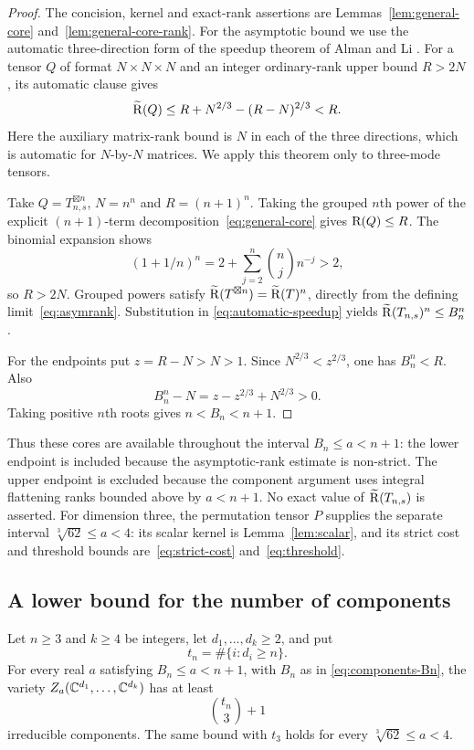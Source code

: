 \begin{proof}
The concision, kernel and exact-rank assertions are
Lemmas~\ref{lem:general-core} and~\ref{lem:general-core-rank}.
For the asymptotic bound we use the automatic three-direction
form of the speedup theorem of Alman and Li \cite[Theorem~6.1]{AlmanLi2026v2}. For a tensor
$Q$ of format $N\times N\times N$ and an integer ordinary-rank
upper bound $R>2N$, its automatic clause gives
\begin{equation}\label{eq:automatic-speedup}
 \widetilde{\mathrm R}(Q)\leq R+N^{2/3}-(R-N)^{2/3}<R.
\end{equation}
Here the auxiliary matrix-rank bound is $N$ in each of the three
directions, which is automatic for $N$-by-$N$ matrices. We apply
this theorem only to three-mode tensors.

Take $Q=T_{n,s}^{\boxtimes n}$, $N=n^n$ and $R=(n+1)^n$.
Taking the grouped $n$th power of the explicit $(n+1)$-term
decomposition~\eqref{eq:general-core} gives $\mathrm R(Q)\leq R$. The binomial expansion shows
\[
 (1+1/n)^n
   =2+\sum_{j=2}^n\binom nj n^{-j}>2,
\]
so $R>2N$. Grouped powers satisfy
$\widetilde{\mathrm R}(T^{\boxtimes n})=\widetilde{\mathrm R}(T)^n$, directly from the defining
limit~\eqref{eq:asymrank}. Substitution in
\eqref{eq:automatic-speedup} yields
$\widetilde{\mathrm R}(T_{n,s})^n\leq B_n^n$.

For the endpoints put $z=R-N>N>1$. Since
$N^{2/3}<z^{2/3}$, one has $B_n^n<R$. Also
\[
 B_n^n-N=z-z^{2/3}+N^{2/3}>0.
\]
Taking positive $n$th roots gives $n<B_n<n+1$.
\end{proof}

Thus these cores are available throughout the interval
$B_n\leq a<n+1$: the lower endpoint is included because the
asymptotic-rank estimate is non-strict. The upper endpoint is
excluded because the component argument uses integral flattening
ranks bounded above by $a<n+1$. No exact value of
$\widetilde{\mathrm R}(T_{n,s})$ is asserted.
For dimension three, the permutation tensor $P$ supplies the
separate interval $\sqrt[3]{62}\leq a<4$: its scalar kernel is
Lemma~\ref{lem:scalar}, and its strict cost and threshold bounds
are~\eqref{eq:strict-cost} and~\eqref{eq:threshold}.

\subsection{A lower bound for the number of components}
\label{sec:components-count}

\begin{theorem}\label{thm:components-count}
Let $n\geq3$ and $k\geq4$ be integers, let $d_1,\ldots,d_k\geq2$, and put
\[
 t_n=\#\{i:d_i\geq n\}.
\]
For every real $a$ satisfying $B_n\leq a<n+1$, with $B_n$ as in
\eqref{eq:components-Bn}, the variety
$Z_a(\mathbb C^{d_1},\ldots,\mathbb C^{d_k})$ has at least
\begin{equation}\label{eq:components-count}
                         \binom{t_n}{3}+1
\end{equation}
irreducible components. The same bound with $t_3$ holds for every
$\sqrt[3]{62}\leq a<4$.
\end{theorem}

